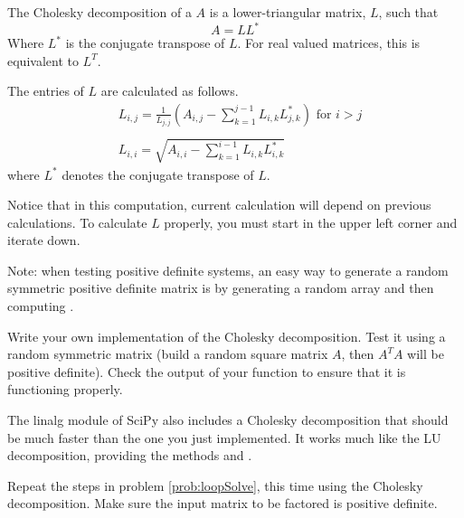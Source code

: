 The Cholesky decomposition of a $A$ is a lower-triangular matrix, $L$, such that
\begin{equation*}
 A = LL^*
\end{equation*}
Where $L^*$ is the conjugate transpose of $L$.
For real valued matrices, this is equivalent to $L^T$.

The entries of $L$ are calculated as follows.
\begin{align*}
&L_{i,j} = \frac{1}{L_{j,j}}\left(A_{i,j} -\sum_{k=1}^{j-1}{L_{i,k}L_{j,k}^*}\right) \mbox{ for $i>j$} \\ \\
&L_{i,i} = \sqrt{A_{i,i} - \sum_{k=1}^{i-1}{L_{i,k}L_{i,k}^*}}
\end{align*}
where $L^*$ denotes the conjugate transpose of $L$.

Notice that in this computation, current calculation will depend on previous calculations.
To calculate $L$ properly, you must start in the upper left corner and iterate down.

Note: when testing positive definite systems, an easy way to generate a random symmetric positive definite matrix is by generating a random array  and then computing .

\begin{problem}
Write your own implementation of the Cholesky decomposition.
Test it using a random symmetric matrix (build a random square matrix $A$, then $A^TA$ will be positive definite).
Check the output of your function to ensure that it is functioning properly.
\end{problem}


The linalg module of SciPy also includes a Cholesky decomposition that should be much faster than the one you just implemented.
It works much like the LU decomposition, providing the methods
 and .

\begin{problem}
Repeat the steps in problem \ref{prob:loopSolve}, this time using the
Cholesky decomposition. Make sure the input matrix to be factored is
positive definite.
\end{problem} 
